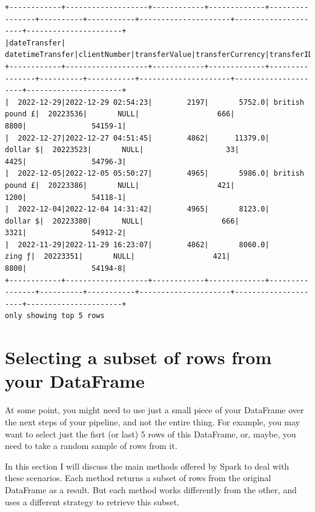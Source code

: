 \documentclass[
  11pt,
  letterpaper,
  DIV=11,
  numbers=noendperiod]{scrreprt}
\begin{document}
\begin{verbatim}
+------------+-------------------+------------+-------------+----------------+----------+-----------+---------------------+---------------------+----------------------+
|dateTransfer|   datetimeTransfer|clientNumber|transferValue|transferCurrency|transferID|transferLog|destinationBankNumber|destinationBankBranch|destinationBankAccount|
+------------+-------------------+------------+-------------+----------------+----------+-----------+---------------------+---------------------+----------------------+
|  2022-12-29|2022-12-29 02:54:23|        2197|       5752.0| british pound £|  20223536|       NULL|                  666|                 8800|               54159-1|
|  2022-12-27|2022-12-27 04:51:45|        4862|      11379.0|        dollar $|  20223523|       NULL|                   33|                 4425|               54796-3|
|  2022-12-05|2022-12-05 05:50:27|        4965|       5986.0| british pound £|  20223386|       NULL|                  421|                 1200|               54118-1|
|  2022-12-04|2022-12-04 14:31:42|        4965|       8123.0|        dollar $|  20223380|       NULL|                  666|                 3321|               54912-2|
|  2022-11-29|2022-11-29 16:23:07|        4862|       8060.0|          zing ƒ|  20223351|       NULL|                  421|                 8800|               54194-8|
+------------+-------------------+------------+-------------+----------------+----------+-----------+---------------------+---------------------+----------------------+
only showing top 5 rows
\end{verbatim}

\hypertarget{selecting-a-subset-of-rows-from-your-dataframe}{%
\section{Selecting a subset of rows from your
DataFrame}\label{selecting-a-subset-of-rows-from-your-dataframe}}

At some point, you might need to use just a small piece of your
DataFrame over the next steps of your pipeline, and not the entire
thing. For example, you may want to select just the fisrt (or last) 5
rows of this DataFrame, or, maybe, you need to take a random sample of
rows from it.

In this section I will discuss the main methods offered by Spark to deal
with these scenarios. Each method returns a subset of rows from the
original DataFrame as a result. But each method works differently from
the other, and uses a different strategy to retrieve this subset.
\end{document}
